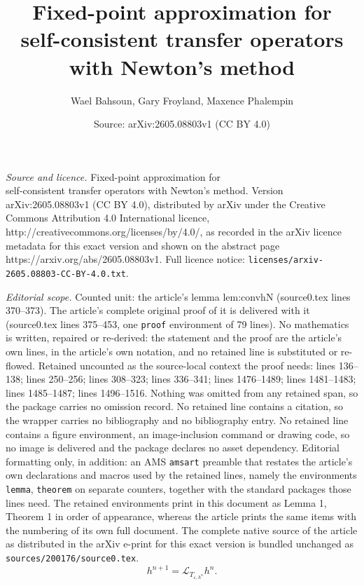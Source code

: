 \documentclass[10pt,a4paper]{amsart}
\title{Fixed-point approximation for\\ self-consistent transfer operators with Newton's method}
\author{Wael Bahsoun, Gary Froyland, Maxence Phalempin}
\date{Source: arXiv:2605.08803v1 (CC BY 4.0)}
\def\L{\mathcal{L}}
\newcommand{\eps}{\varepsilon}
\begin{document}
\maketitle

\noindent\emph{Source and licence.} Fixed-point approximation for\\ self-consistent transfer operators with Newton's method. Version arXiv:2605.08803v1 (CC BY 4.0), distributed by arXiv under the Creative Commons Attribution 4.0 International licence, http://creativecommons.org/licenses/by/4.0/, as recorded in the arXiv licence metadata for this exact version and shown on the abstract page https://arxiv.org/abs/2605.08803v1. Full licence notice: \texttt{licenses/arxiv-2605.08803-CC-BY-4.0.txt}.\par\smallskip

\noindent\textit{Editorial scope.} Counted unit: the article's lemma lem:convhN (source0.tex lines 370--373). The article's complete original proof of it is delivered with it (source0.tex lines 375--453, one \texttt{proof} environment of 79 lines). No mathematics is written, repaired or re-derived: the statement and the proof are the article's own lines, in the article's own notation, and no retained line is substituted or re-flowed.  Retained uncounted as the source-local context the proof needs: lines 136--138; lines 250--256; lines 308--323; lines 336--341; lines 1476--1489; lines 1481--1483; lines 1485--1487; lines 1496--1516.  Nothing was omitted from any retained span, so the package carries no omission record.  No retained line contains a citation, so the wrapper carries no bibliography and no bibliography entry.  No retained line contains a figure environment, an image-inclusion command or drawing code, so no image is delivered and the package declares no asset dependency.  Editorial formatting only, in addition: an AMS \texttt{amsart} preamble that restates the article's own declarations and macros used by the retained lines, namely the environments \texttt{lemma}, \texttt{theorem} on separate counters, together with the standard packages those lines need.  The retained environments print in this document as Lemma 1, Theorem 1 in order of appearance, whereas the article prints the same items with the numbering of its own full document.  The complete native source of the article as distributed in the arXiv e-print for this exact version is bundled unchanged as \texttt{sources/200176/source0.tex}.
\begin{equation}\label{eq:evolve}
h^{n+1}=\L_{T_{\eps,h^{n}}}h^n.
\end{equation}
\end{document}
